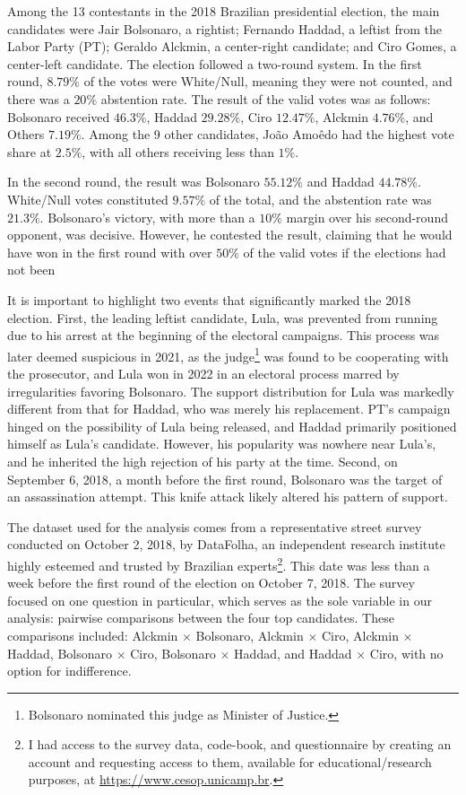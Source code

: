 \documentclass[hidelinks,11pt]{article} \usepackage[utf8]{inputenc}
\begin{document}
Among the 13 contestants in the 2018 Brazilian presidential election, the main
candidates were Jair Bolsonaro, a rightist; Fernando Haddad, a leftist from the
Labor Party (PT); Geraldo Alckmin, a center-right candidate; and Ciro Gomes, a
center-left candidate. The election followed a two-round system. In the first
round, \(8.79\%\) of the votes were White/Null, meaning they were not counted,
and there was a \(20\%\) abstention rate. The result of the valid votes was as
follows: Bolsonaro received \(46.3\%\), Haddad \(29.28\%\), Ciro \(12.47\%\),
Alckmin \(4.76\%\), and Others \(7.19\%\). Among the 9 other candidates, Jo\~ao
Amo\^edo had the highest vote share at \(2.5\%\), with all others receiving less
than \(1\%\).

In the second round, the result was Bolsonaro \(55.12\%\) and Haddad
\(44.78\%\). White/Null votes constituted \(9.57\%\) of the total, and the
abstention rate was \(21.3\%\). Bolsonaro's victory, with more than a \(10\%\)
margin over his second-round opponent, was decisive. However, he contested the
result, claiming that he would have won in the first round with over \(50\%\) of
the valid votes if the elections had not been


It is important to highlight two events that significantly marked the 2018
election. First, the leading leftist candidate, Lula, was prevented from running
due to his arrest at the beginning of the electoral campaigns. This process was
later deemed suspicious in 2021, as the judge\footnote{Bolsonaro nominated this
  judge as Minister of Justice.} was found to be cooperating with the
prosecutor, and Lula won in 2022 in an electoral process marred by
irregularities favoring Bolsonaro. The support distribution for Lula was
markedly different from that for Haddad, who was merely his replacement. PT's
campaign hinged on the possibility of Lula being released, and Haddad primarily
positioned himself as Lula's candidate. However, his popularity was nowhere near
Lula's, and he inherited the high rejection of his party at the time. Second, on
September 6, 2018, a month before the first round, Bolsonaro was the target of
an assassination attempt. This knife attack likely altered his pattern of
support.


The dataset used for the analysis comes from a representative street survey
conducted on October 2, 2018, by DataFolha, an independent research institute
highly esteemed and trusted by Brazilian experts\footnote{I had access to the
  survey data, code-book, and questionnaire by creating an account and
  requesting access to them, available for educational/research purposes,
  at \url{https://www.cesop.unicamp.br}.}. This date was less than a week before
the first round of the election on October 7, 2018. The survey focused on one
question in particular, which serves as the sole variable in our analysis:
pairwise comparisons between the four top candidates. These comparisons
included: Alckmin \(\times\) Bolsonaro, Alckmin \(\times\) Ciro, Alckmin
\(\times\) Haddad, Bolsonaro \(\times\) Ciro, Bolsonaro \(\times\) Haddad, and
Haddad \(\times\) Ciro, with no option for indifference.
\end{document}
